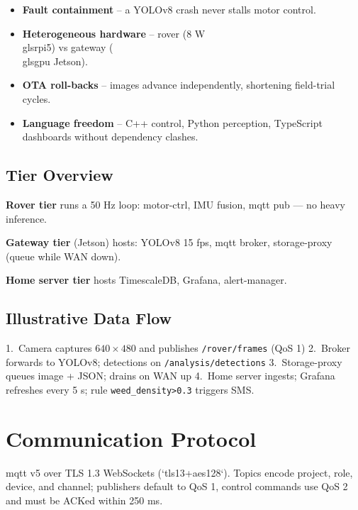 \begin{itemize}
\item \textbf{Fault containment} – a YOLOv8 crash never stalls motor
control.
\item \textbf{Heterogeneous hardware} – rover (8 W \\gls{rpi5}) vs gateway
(\\gls{gpu} Jetson).
\item \textbf{OTA roll-backs} – images advance independently, shortening
field-trial cycles.
\item \textbf{Language freedom} – C++ control, Python perception,
TypeScript dashboards without dependency clashes.
\end{itemize}

\subsection{Tier Overview}\label{subsec:tier-overview}

\textbf{Rover tier} runs a 50 Hz loop: motor-ctrl, IMU fusion, \gls{mqtt} pub —
no heavy inference.

\textbf{Gateway tier} (Jetson) hosts:
YOLOv8 15 fps, \gls{mqtt} broker, storage-proxy (queue while WAN down).

\textbf{Home server tier} hosts TimescaleDB, Grafana, alert-manager.

\subsection{Illustrative Data Flow}\label{subsec:illustrative-data-flow}

1.~Camera captures $640\times480$ and publishes \texttt{/rover/frames} (QoS 1)
2.~Broker forwards to YOLOv8; detections on \texttt{/analysis/detections}
3.~Storage-proxy queues image + JSON; drains on WAN up
4.~Home server ingests; Grafana refreshes every 5 s; rule \texttt{weed\_density>0.3} triggers SMS\@.

\section{Communication Protocol}
\label{sec:impl:protocol}

\gls{mqtt} v5 over TLS 1.3 WebSockets (`tls13+aes128`).
Topics encode project,
role, device, and channel; publishers default to QoS 1, control commands
use QoS 2 and must be ACKed within 250 ms.

